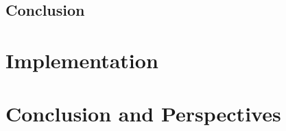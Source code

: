 \documentclass[12pt]{report}
\begin{document}
\section*{Conclusion}





\setcounter{chapter}{5} 
\chapter{Implementation} %
\label{chap:implementation}


\pagebreak  %






\newpage

\chapter*{Conclusion and Perspectives}




\end{document}
